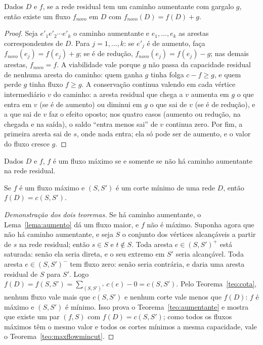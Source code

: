 \begin{lema}\label{lema:aumento}
Dados $D$ e $f$, se a rede residual tem um caminho aumentante com gargalo $g$, então existe um fluxo $f_{novo}$ em $D$ com $f_{novo}(D)=f(D)+g$.
\end{lema}
\begin{proof}
Seja $e'_1e'_2\cdots e'_k$ o caminho aumentante e $e_1,\dots,e_k$ as arestas correspondentes de $D$. Para $j=1,\dots,k$: se $e'_j$ é de aumento, faça $f_{novo}(e_j)=f(e_j)+g$; se é de redução, $f_{novo}(e_j)=f(e_j)-g$; nas demais arestas, $f_{novo}=f$. A viabilidade vale porque $g$ não passa da capacidade residual de nenhuma aresta do caminho: quem ganha $g$ tinha folga $c-f\ge g$, e quem perde $g$ tinha fluxo $f\ge g$. A conservação continua valendo em cada vértice intermediário $v$ do caminho: a aresta residual que chega a $v$ aumenta em $g$ o que entra em $v$ (se é de aumento) ou diminui em $g$ o que sai de $v$ (se é de redução), e a que sai de $v$ faz o efeito oposto; nos quatro casos (aumento ou redução, na chegada e na saída), o saldo ``entra menos sai'' de $v$ continua zero. Por fim, a primeira aresta sai de $s$, onde nada entra; ela só pode ser de aumento, e o valor do fluxo cresce $g$.
\end{proof}

\begin{teo}\label{teo:aumentante}
Dados $D$ e $f$, $f$ é um fluxo máximo se e somente se não há caminho aumentante na rede residual.
\end{teo}
\begin{teo}\label{teo:maxflowmincut}
Se $f$ é um fluxo máximo e $(S,S')$ é um corte mínimo de uma rede $D$, então $f(D)=c(S,S')$.
\end{teo}
\begin{proof}[Demonstração dos dois teoremas]
Se há caminho aumentante, o Lema~\ref{lema:aumento} dá um fluxo maior, e $f$ não é máximo. Suponha agora que não há caminho aumentante, e seja $S$ o conjunto dos vértices alcançáveis a partir de $s$ na rede residual; então $s\in S$ e $t\notin S$. Toda aresta $e\in(S,S')^+$ está saturada: senão ela seria direta, e o seu extremo em $S'$ seria alcançável. Toda aresta $e\in(S,S')^-$ tem fluxo zero: senão seria contrária, e daria uma aresta residual de $S$ para $S'$. Logo $f(D)=f(S,S')=\sum_{(S,S')^+}c(e)-0=c(S,S')$. Pelo Teorema~\ref{teo:cota}, nenhum fluxo vale mais que $c(S,S')$ e nenhum corte vale menos que $f(D)$: $f$ é máximo e $(S,S')$ é mínimo. Isso prova o Teorema~\ref{teo:aumentante} e mostra que existe um par $(f,S)$ com $f(D)=c(S,S')$; como todos os fluxos máximos têm o mesmo valor e todos os cortes mínimos a mesma capacidade, vale o Teorema~\ref{teo:maxflowmincut}.
\end{proof}

